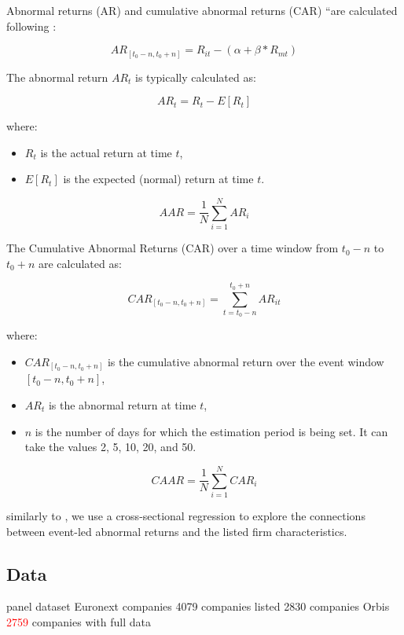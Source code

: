 \documentclass[12pt,a4paper]{article}
\begin{document}
Abnormal returns (AR) and cumulative abnormal returns (CAR) ``are calculated following \cite{brown_using_1985}: 

\begin{equation}
AR_{[t_0-n, t_0+n]} = R_{it} - (\alpha + \beta*R_{mt})
\end{equation}

The abnormal return $AR_t$ is typically calculated as:

\begin{equation}
AR_t = R_t - E[R_t]
\end{equation}

where:
\begin{itemize}
    \item $R_t$ is the actual return at time $t$,
    \item $E[R_t]$ is the expected (normal) return at time $t$.
\end{itemize}

\begin{equation}
{AAR} = \frac{1}{N} \sum_{i=1}^{N} AR_i  
\end{equation}

The Cumulative Abnormal Returns (CAR) over a time window from $t_0-n$ to $t_0+n$ are calculated as:

\begin{equation}
CAR_{[t_0-n, t_0+n]} = \sum_{t=t_0-n}^{t_0+n} AR_{it}
\end{equation}

where:
\begin{itemize}
    \item $CAR_{[t_0-n, t_0+n]}$ is the cumulative abnormal return over the event window $[t_0-n, t_0+n]$,
    \item $AR_t$ is the abnormal return at time $t$,
    \item $n$ is the number of days for which the estimation period is being set. It can take the values 2, 5, 10, 20, and 50.  	
\end{itemize}


\begin{equation}
{CAAR} = \frac{1}{N} \sum_{i=1}^{N} CAR_i  
\end{equation}

similarly to \citep[p.~1]{kumari_what_2022}, we use a cross-sectional regression to explore the connections between event-led abnormal returns and the listed firm characteristics. 
\subsection{Data}
panel dataset 
Euronext companies
4079 companies listed
2830 companies Orbis
\textcolor{red}{2759} companies with full data
\end{document}

